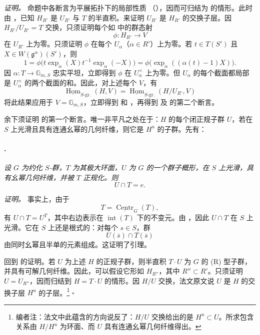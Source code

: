 \textit{证明。}
命题中各断言为平展拓扑下的局部性质 \textup{（）}，因而可归结为  的情形。此时由 ，已知 \(H_{R'}\) 是 \(U_{R'}\) 与 \(T\) 的半直积。来证明 \(U_{R'}\) 是 \(H_{R'}\) 的交换子层。因 \(H_{R'}/U_{R'}=T\) 交换，只须证明每个如 \textup{} 中的群态射
\[
  \phi:H_{R'}\longrightarrow V
\]
在 \(U_{R'}\) 上为零。只须证明 \(\phi\) 在每个 \(U_\alpha\)（\(\alpha\in R'\)）上为零。若 \(t\in T(S')\) 且 \(X\in W(\mathfrak g^\alpha)(S')\)，则
\[
  1
  =
  \phi\bigl(t\exp_\alpha(X)t^{-1}\exp_\alpha(-X)\bigr)
  =
  \phi\bigl(\exp_\alpha((\alpha(t)-1)X)\bigr).
\]
因 \(\alpha:T\longrightarrow\mathbb G_{m,S}\) 忠实平坦，立即得到 \(\phi\) 在 \(U_\alpha^\times\) 上为零。但 \(U_\alpha\) 的每个截面都局部是 \(U_\alpha^\times\) 的两个截面的和。因此，对上述每个 \(V\)，有
\[
  \underline{\operatorname{Hom}}_{S\text{-gr.}}(H,V)
  =
  \underline{\operatorname{Hom}}_{S\text{-gr.}}
    (H/U_{R'},V)
\]
将此结果应用于 \(V=\mathbb G_{m,S}\)，立即得到 \textup{} 和 \textup{}，再得到 \textup{} 及 \textup{} 的第二个断言。

余下须证明 \textup{} 的第一个断言。唯一非平凡之处在于：\(H\) 的每个闭正规子群 \(U\)，若在 \(S\) 上光滑且具有连通幺幂的几何纤维，则它是 \(H^u\) 的子群。先有：

\paragraph{.}
\textit{设 \(G\) 为约化 \(S\)-群，\(T\) 为其极大环面，\(U\) 为 \(G\) 的一个群子概形，在 \(S\) 上光滑，具有幺幂几何纤维，并被 \(T\) 正规化。则}
\[
  U\cap T=e.
\]

\textit{证明。}
事实上，由于
\[
  T=\underline{\operatorname{Centr}}_G(T),
\]
有 \(U\cap T=U^T\)，其中右边表示在 \(\operatorname{int}(T)\) 下的不变元。由 ，因此 \(U\cap T\) 在 \(S\) 上光滑。它在 \(S\) 上还是根式的：对每个 \(s\in S\)，群
\[
  U(\overline s)\cap T(\overline s)
\]
由同时幺幂且半单的元素组成。这证明了引理。

回到 \textup{} 的证明。若 \(U\) 为上述 \(H\) 的正规子群，则半直积 \(T\cdot U\) 为 \(G\) 的 \textup{(R)} 型子群，并具有可解几何纤维。因此，可以假设它形如 \(H_{R''}\)，其中 \(R''\subset R'\)。只须证明 \(U=U_{R''}\)，因而归结到 \(H=T\cdot U\) 的情形。因 \(H/U\) 交换，法文原文说 \(U\) 是 \(H\) 的交换子层 \(H^u\) 的子层。\footnote{编者注：法文中此蕴含的方向说反了：\(H/U\) 交换给出的是 \(H^u\subset U\)。所求包含关系由 \(H/H^u\) 为环面、而 \(U\) 具有连通幺幂几何纤维得出。}
\hfill\(\square\)

